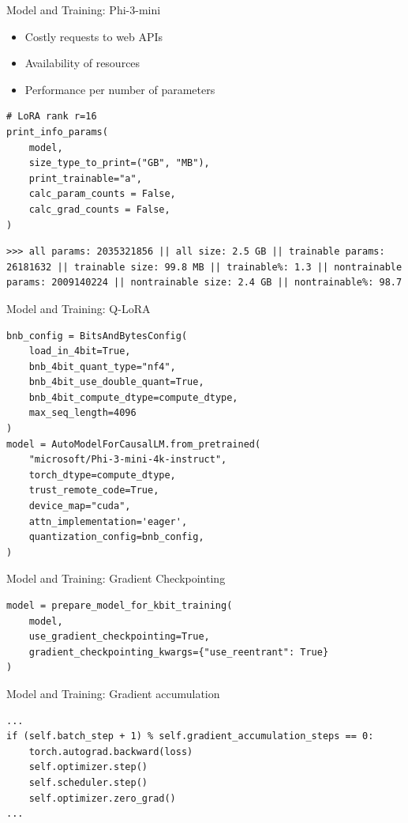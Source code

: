 \documentclass[aspectratio=169,xcolor=dvipsnames]{beamer}
\begin{document}
\begin{frame}[fragile]{Model and Training: Phi-3-mini}
\begin{itemize}
\item Costly requests to web APIs
\item Availability of resources
\item Performance per number of parameters
\end{itemize}
\begin{verbatim}
# LoRA rank r=16
print_info_params(
    model,
    size_type_to_print=("GB", "MB"),
    print_trainable="a",
    calc_param_counts = False,
    calc_grad_counts = False,
)
\end{verbatim}
\begin{verbatim}
>>> all params: 2035321856 || all size: 2.5 GB || trainable params: 26181632 || trainable size: 99.8 MB || trainable%: 1.3 || nontrainable params: 2009140224 || nontrainable size: 2.4 GB || nontrainable%: 98.7
\end{verbatim}
\end{frame}
\begin{frame}[fragile]{Model and Training: Q-LoRA}
\begin{verbatim}
bnb_config = BitsAndBytesConfig(
    load_in_4bit=True,
    bnb_4bit_quant_type="nf4",
    bnb_4bit_use_double_quant=True,
    bnb_4bit_compute_dtype=compute_dtype, 
    max_seq_length=4096
)
model = AutoModelForCausalLM.from_pretrained(
    "microsoft/Phi-3-mini-4k-instruct",
    torch_dtype=compute_dtype,
    trust_remote_code=True,
    device_map="cuda",
    attn_implementation='eager',
    quantization_config=bnb_config,
)
\end{verbatim}
\end{frame}
\begin{frame}[fragile]{Model and Training: Gradient Checkpointing}
\begin{verbatim}
model = prepare_model_for_kbit_training(
    model,
    use_gradient_checkpointing=True,
    gradient_checkpointing_kwargs={"use_reentrant": True}
)
\end{verbatim}
\end{frame}
\begin{frame}[fragile]{Model and Training: Gradient accumulation}
\begin{verbatim}
...
if (self.batch_step + 1) % self.gradient_accumulation_steps == 0:
    torch.autograd.backward(loss)
    self.optimizer.step()
    self.scheduler.step()
    self.optimizer.zero_grad()
...
\end{verbatim}
\end{frame}
\end{document}
